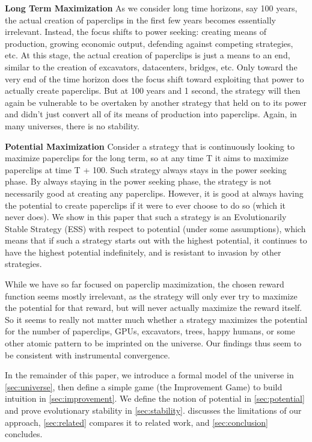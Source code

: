 \textbf{Long Term Maximization} As we consider long time horizons, say 100 years, the
actual creation of paperclips in the first few years becomes essentially irrelevant.
Instead, the focus shifts to power seeking: creating means of production, growing economic output, 
defending against competing strategies, etc. At this stage,
the actual creation of paperclips is just a means to an end, similar to the creation of
excavators, datacenters, bridges, etc. Only toward the very end of the time
horizon does the focus shift toward exploiting that power to actually create
paperclips. But at 100 years and 1 second, the strategy will then again be
vulnerable to be overtaken by another strategy that held on to its power and
didn't just convert all of its means of production into paperclips. Again, in many
universes, there is no stability.

\textbf{Potential Maximization} Consider a strategy that is continuously looking to maximize
paperclips for the long term, so at any time T it aims to maximize
paperclips at time T + 100. Such strategy always stays in the power seeking
phase. By always staying in the power seeking phase, the strategy is not
necessarily good at creating any paperclips. However, it is good at always
having the potential to create paperclips if it were to ever choose to do so
(which it never does). We show in this paper that such a strategy is an
Evolutionarily Stable Strategy (ESS) with respect to potential (under some assumptions), 
which means that if such a strategy starts out with the highest potential, it continues to have
the highest potential indefinitely, and is resistant to invasion by other
strategies.

While we have so far focused on paperclip maximization, the chosen
reward function seems mostly irrelevant, as the strategy will only ever try to
maximize the potential for that reward, but will never actually maximize the
reward itself. So it seems to really not matter much whether a strategy maximizes the potential for the number of paperclips,
GPUs, excavators, trees, happy humans, or some other atomic pattern to be
imprinted on the universe. Our findings thus seem to be
consistent with instrumental convergence.

In the remainder of this paper, we introduce a formal model of the universe
in \cref{sec:universe}, then define a simple game (the Improvement Game) to
build intuition in \cref{sec:improvement}. We define the notion of potential
in \cref{sec:potential} and prove evolutionary stability in
\cref{sec:stability}.  discusses the limitations of our
approach, \cref{sec:related} compares it to related work, and
\cref{sec:conclusion} concludes.

